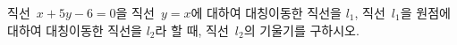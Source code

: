 직선~$x+5y-6=0$을 직선~$y=x$에 대하여 대칭이동한 직선을 $l_1$, 직선~$l_1$을 원점에 대하여 대칭이동한 직선을 $l_2$라 할 때, 직선~$l_2$의 기울기를 구하시오.
